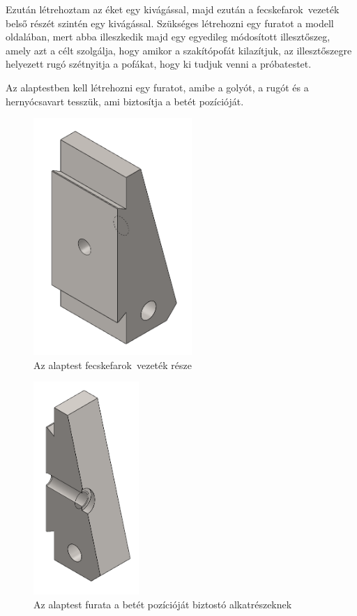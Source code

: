 \documentclass[12pt,a4paper,oneside]{report}
\begin{document}
Ezután létrehoztam az éket egy kivágással, majd ezután a \glqq fecskefarok\grqq\ vezeték belső részét szintén egy kivágással. Szükséges létrehozni egy furatot a modell oldalában, mert abba illeszkedik majd egy egyedileg módosított illesztőszeg, amely azt a célt szolgálja, hogy amikor a szakítópofát kilazítjuk, az illesztőszegre helyezett rugó szétnyitja a pofákat, hogy ki tudjuk venni a próbatestet.

Az alaptestben kell létrehozni egy furatot, amibe a golyót, a rugót és a hernyócsavart tesszük, ami biztosítja a betét pozícióját.

\begin{figure}[H]
\centering
\includegraphics[width=6cm]{figures/alaptest_vezetek}
\caption{Az alaptest \glqq fecskefarok\grqq\ vezeték része}
\label{Fig:alaptest_vezetek}
\end{figure}

\begin{figure}[H]
\centering
\includegraphics[width=4cm]{figures/alaptest_furat}
\caption{Az alaptest furata a betét pozícióját biztostó alkatrészeknek}
\label{Fig:alaptest_furat}
\end{figure}
\end{document}
